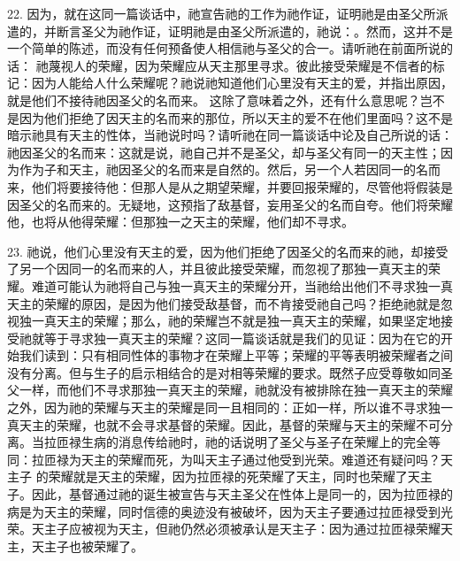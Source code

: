 22. 因为，就在这同一篇谈话中，祂宣告祂的工作为祂作证，证明祂是由圣父所派遣的，并断言圣父为祂作证，证明祂是由圣父所派遣的，祂说：。然而，这并不是一个简单的陈述，而没有任何预备使人相信祂与圣父的合一。请听祂在前面所说的话： 祂蔑视人的荣耀，因为荣耀应从天主那里寻求。彼此接受荣耀是不信者的标记：因为人能给人什么荣耀呢？祂说祂知道他们心里没有天主的爱，并指出原因，就是他们不接待祂因圣父的名而来。 这除了意味着之外，还有什么意思呢？岂不是因为他们拒绝了因天主的名而来的那位，所以天主的爱不在他们里面吗？这不是暗示祂具有天主的性体，当祂说时吗？请听祂在同一篇谈话中论及自己所说的话： 祂因圣父的名而来：这就是说，祂自己并不是圣父，却与圣父有同一的天主性；因为作为子和天主，祂因圣父的名而来是自然的。然后，另一个人若因同一的名而来，他们将要接待他：但那人是从之期望荣耀，并要回报荣耀的，尽管他将假装是因圣父的名而来的。无疑地，这预指了敌基督，妄用圣父的名而自夸。他们将荣耀他，也将从他得荣耀：但那独一之天主的荣耀，他们却不寻求。\par

23. 祂说，他们心里没有天主的爱，因为他们拒绝了因圣父的名而来的祂，却接受了另一个因同一的名而来的人，并且彼此接受荣耀，而忽视了那独一真天主的荣耀。难道可能认为祂将自己与独一真天主的荣耀分开，当祂给出他们不寻求独一真天主的荣耀的原因，是因为他们接受敌基督，而不肯接受祂自己吗？拒绝祂就是忽视独一真天主的荣耀；那么，祂的荣耀岂不就是独一真天主的荣耀，如果坚定地接受祂就等于寻求独一真天主的荣耀？这同一篇谈话就是我们的见证：因为在它的开始我们读到：只有相同性体的事物才在荣耀上平等；荣耀的平等表明被荣耀者之间没有分离。但与生子的启示相结合的是对相等荣耀的要求。既然子应受尊敬如同圣父一样，而他们不寻求那独一真天主的荣耀，祂就没有被排除在独一真天主的荣耀之外，因为祂的荣耀与天主的荣耀是同一且相同的：正如一样，所以谁不寻求独一真天主的荣耀，也就不会寻求基督的荣耀。因此，基督的荣耀与天主的荣耀不可分离。当拉匝禄生病的消息传给祂时，祂的话说明了圣父与圣子在荣耀上的完全等同：拉匝禄为天主的荣耀而死，为叫天主子通过他受到光荣。难道还有疑问吗？天主子 的荣耀就是天主的荣耀，因为拉匝禄的死荣耀了天主，同时也荣耀了天主子。因此，基督通过祂的诞生被宣告与天主圣父在性体上是同一的，因为拉匝禄的病是为天主的荣耀，同时信德的奥迹没有被破坏，因为天主子要通过拉匝禄受到光荣。天主子应被视为天主，但祂仍然必须被承认是天主子：因为通过拉匝禄荣耀天主，天主子也被荣耀了。\par

